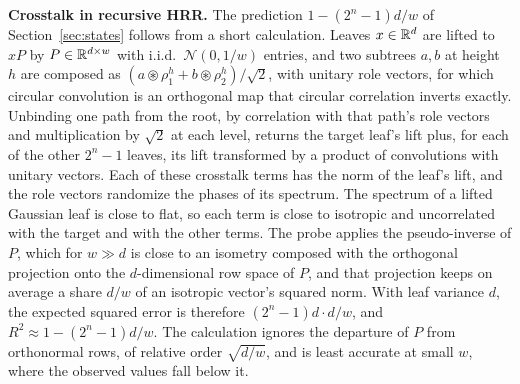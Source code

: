 \noindent
\textbf{Crosstalk in recursive HRR.} The prediction $1 - (2^n - 1)d/w$ of Section~\ref{sec:states} follows from a short calculation. Leaves $x \in \mathbb{R}^d$ are lifted to $xP$ by $P \in \mathbb{R}^{d \times w}$ with i.i.d.\ $\mathcal{N}(0, 1/w)$ entries, and two subtrees $a, b$ at height $h$ are composed as $(a \circledast \rho^h_1 + b \circledast \rho^h_2)/\sqrt{2}$, with unitary role vectors, for which circular convolution is an orthogonal map that circular correlation inverts exactly. Unbinding one path from the root, by correlation with that path's role vectors and multiplication by $\sqrt{2}$ at each level, returns the target leaf's lift plus, for each of the other $2^n - 1$ leaves, its lift transformed by a product of convolutions with unitary vectors. Each of these crosstalk terms has the norm of the leaf's lift, and the role vectors randomize the phases of its spectrum. The spectrum of a lifted Gaussian leaf is close to flat, so each term is close to isotropic and uncorrelated with the target and with the other terms. The probe applies the pseudo-inverse of $P$, which for $w \gg d$ is close to an isometry composed with the orthogonal projection onto the $d$-dimensional row space of $P$, and that projection keeps on average a share $d/w$ of an isotropic vector's squared norm. With leaf variance $d$, the expected squared error is therefore $(2^n - 1)d \cdot d/w$, and $R^2 \approx 1 - (2^n - 1)d/w$. The calculation ignores the departure of $P$ from orthonormal rows, of relative order $\sqrt{d/w}$, and is least accurate at small $w$, where the observed values fall below it.

